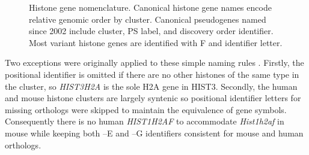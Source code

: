     \begin{figure*}
      \centering
      \caption{Histone gene nomenclature.
               Canonical histone gene names encode relative genomic order by cluster.
               Canonical pseudogenes named since 2002 include cluster,
               PS label, and discovery order identifier.
               Most variant histone genes are identified with F and identifier letter.}
      \label{fig:nomenclature}
    \end{figure*}

    Two exceptions were originally applied to these simple naming rules \citep{Marzluff02}.
    Firstly, the positional identifier is omitted if there are no
    other histones of the same type in the cluster,
    so \textit{HIST3H2A} is the sole H2A gene in HIST3.
    Secondly, the human and mouse histone clusters are largely syntenic
    so positional identifier letters for missing orthologs were skipped
    to maintain the equivalence of gene symbols.
    Consequently there is no human \textit{HIST1H2AF} to accommodate
    \textit{Hist1h2af} in mouse while keeping both --E and --G identifiers
    consistent for mouse and human orthologs.


